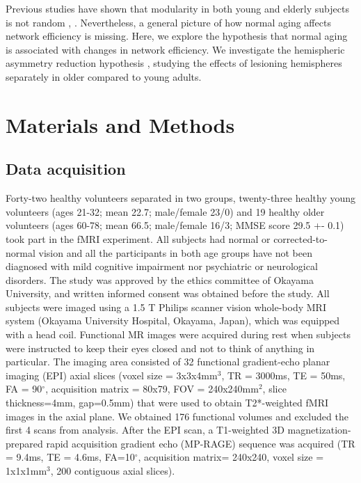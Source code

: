 \documentclass[12pt,a4paper]{article}
\begin{document}
Previous studies have shown that modularity in both young and elderly subjects is not random \cite{meunier_age-related_2009}, \cite{song_age-related_2014}. Nevertheless, a general picture of how normal aging affects network efficiency is missing. Here, we explore the hypothesis that normal aging  is associated with changes in network efficiency. 
We investigate the hemispheric asymmetry reduction hypothesis \cite{cabeza_aging_2002}, studying the effects of lesioning hemispheres separately in older compared to young adults.  


\section{Materials and Methods}
\label{mat-methods}

\subsection{Data acquisition}

Forty-two healthy volunteers separated in two groups, twenty-three healthy young volunteers (ages 21-32; mean 22.7; male/female 23/0) and 19 healthy older volunteers (ages 60-78; mean 66.5; male/female 16/3; MMSE score 29.5 +- 0.1) took part in the fMRI experiment. All subjects had
normal or corrected-to-normal vision and all the participants in both age groups have not been diagnosed with mild cognitive impairment nor psychiatric or neurological disorders. 
The study was approved by the ethics
committee of Okayama University, and written informed consent was obtained before the study. All subjects were imaged using a 1.5 T Philips scanner vision whole-body MRI system (Okayama University Hospital, Okayama, Japan), which was equipped with a head coil. Functional MR images were acquired during rest when subjects were
 instructed to keep their eyes closed and not to think of anything in
 particular. The imaging area consisted of 32 functional gradient-echo planar
 imaging (EPI) axial slices (voxel size = 3x3x4mm$^3$, TR = 3000ms, TE = 50ms,
 FA = 90$^\circ$, acquisition matrix = 80x79, FOV = 240x240mm$^2$, slice thickness=4mm, gap=0.5mm) that were used to obtain T2*-weighted fMRI images in the
 axial plane. We obtained 176 functional volumes and excluded the first 4 scans
 from analysis. After the EPI scan, a T1-weighted 3D magnetization-prepared
 rapid acquisition gradient echo (MP-RAGE) sequence was acquired (TR = 9.4ms, TE = 4.6ms, FA=10$^\circ$, acquisition matrix= 240x240, voxel size = 1x1x1mm$^3$, 200 contiguous axial slices).
\end{document}
